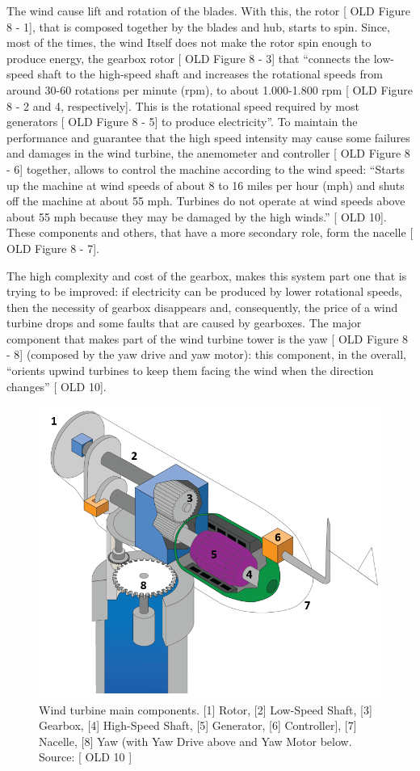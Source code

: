 The wind cause lift and rotation of the blades. With this, the rotor [ OLD Figure 8 - 1], that is composed together by the blades and hub, starts to spin. Since, most of the times, the wind Itself does not make the rotor spin enough to produce energy, the gearbox rotor [ OLD Figure 8 - 3] that “connects the low-speed shaft to the high-speed shaft and increases the rotational speeds from around 30-60 rotations per minute (rpm), to about 1.000-1.800 rpm [ OLD Figure 8 - 2 and 4, respectively]. This is the rotational speed required by most generators [ OLD Figure 8 - 5] to produce electricity”. To maintain the performance and guarantee that the high speed intensity may cause some failures and damages in the wind turbine, the anemometer and controller [ OLD Figure 8 - 6] together, allows to control the machine according to the wind speed: “Starts up the machine at wind speeds of about 8 to 16 miles per hour (mph) and shuts off the machine at about 55 mph. Turbines do not operate at wind speeds above about 55 mph because they may be damaged by the high winds.” [ OLD 10]. These components and others, that have a more secondary role, form the nacelle [ OLD Figure 8 - 7].

The high complexity and cost of the gearbox, makes this system part one that is trying to be improved: if electricity can be produced by lower rotational speeds, then the necessity of gearbox disappears and, consequently, the price of a wind turbine drops and some faults that are caused by gearboxes.
The major component that makes part of the wind turbine tower is the yaw [ OLD Figure 8 - 8] (composed by the yaw drive and yaw motor): this component, in the overall, “orients upwind turbines to keep them facing the wind when the direction changes” [ OLD 10].


\begin{figure}[htbp]
	\centering
	\includegraphics[scale=0.5]{Chapters/Figures/background_fig8.PNG}
	\caption{Wind turbine main components. [1] Rotor, [2] Low-Speed Shaft, [3] Gearbox, [4] High-Speed Shaft, [5] Generator, [6] Controller], [7] Nacelle, [8] Yaw (with Yaw Drive above and Yaw Motor below. Source: [ OLD 10 ]}
	\label{fig:Figuras_Tree_silhouettes-vectorial}
\end{figure}



